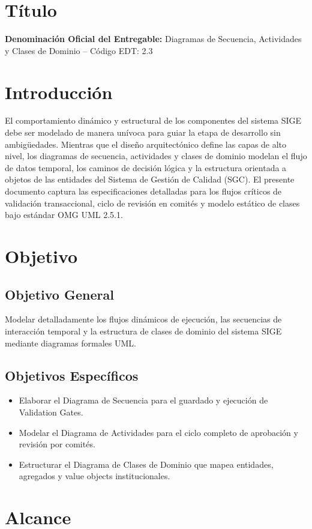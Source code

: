\documentclass[12pt,a4paper]{article}
\begin{document}
\section{Título}
\textbf{Denominación Oficial del Entregable:} Diagramas de Secuencia, Actividades y Clases de Dominio -- Código EDT: 2.3

\section{Introducción}
El comportamiento dinámico y estructural de los componentes del sistema SIGE debe ser modelado de manera unívoca para guiar la etapa de desarrollo sin ambigüedades. Mientras que el diseño arquitectónico define las capas de alto nivel, los diagramas de secuencia, actividades y clases de dominio modelan el flujo de datos temporal, los caminos de decisión lógica y la estructura orientada a objetos de las entidades del Sistema de Gestión de Calidad (SGC). El presente documento captura las especificaciones detalladas para los flujos críticos de validación transaccional, ciclo de revisión en comités y modelo estático de clases bajo estándar OMG UML 2.5.1.

\section{Objetivo}
\subsection{Objetivo General}
Modelar detalladamente los flujos dinámicos de ejecución, las secuencias de interacción temporal y la estructura de clases de dominio del sistema SIGE mediante diagramas formales UML.
\subsection{Objetivos Específicos}
\begin{itemize}[leftmargin=1.5em, itemsep=2pt]
    \item Elaborar el Diagrama de Secuencia para el guardado y ejecución de Validation Gates.
    \item Modelar el Diagrama de Actividades para el ciclo completo de aprobación y revisión por comités.
    \item Estructurar el Diagrama de Clases de Dominio que mapea entidades, agregados y value objects institucionales.
\end{itemize}

\section{Alcance}
\end{document}

